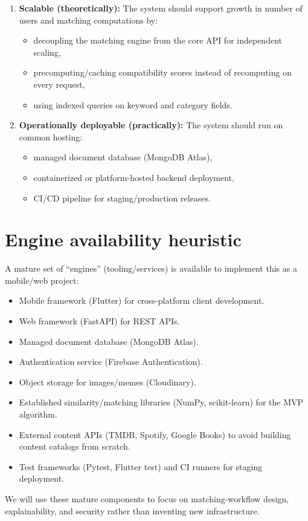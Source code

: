 \documentclass[11pt,a4paper]{article}
\begin{document}
\begin{enumerate}[leftmargin=0.7cm]
    \item \textbf{Scalable (theoretically):} The system should support growth in number of users and matching computations by:
    \begin{itemize}[leftmargin=0.7cm]
        \item decoupling the matching engine from the core API for independent scaling,
        \item precomputing/caching compatibility scores instead of recomputing on every request,
        \item using indexed queries on keyword and category fields.
    \end{itemize}
    
    \item \textbf{Operationally deployable (practically):} The system should run on common hosting:
    \begin{itemize}[leftmargin=0.7cm]
        \item managed document database (MongoDB Atlas),
        \item containerized or platform-hosted backend deployment,
        \item CI/CD pipeline for staging/production releases.
    \end{itemize}
\end{enumerate}

\section{Engine availability heuristic}
A mature set of ``engines'' (tooling/services) is available to implement this as a mobile/web project:
\begin{itemize}[leftmargin=0.7cm]
    \item Mobile framework (Flutter) for cross-platform client development.
    \item Web framework (FastAPI) for REST APIs.
    \item Managed document database (MongoDB Atlas).
    \item Authentication service (Firebase Authentication).
    \item Object storage for images/memes (Cloudinary).
    \item Established similarity/matching libraries (NumPy, scikit-learn) for the MVP algorithm.
    \item External content APIs (TMDB, Spotify, Google Books) to avoid building content catalogs from scratch.
    \item Test frameworks (Pytest, Flutter test) and CI runners for staging deployment.
\end{itemize}
We will use these mature components to focus on matching-workflow design, explainability, and security rather than inventing new infrastructure.
\end{document}
